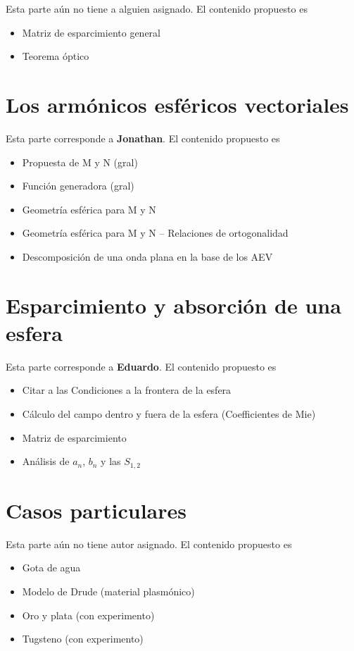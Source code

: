 \documentclass[12pts,a4paper]{book}
\begin{document}
Esta parte aún no tiene a alguien asignado. El contenido propuesto es

\begin{itemize}
 \item Matriz de esparcimiento general
 \item Teorema óptico
\end{itemize}



\chapter{Los armónicos esféricos vectoriales}
\label{ch:AEV} %
Esta parte corresponde a \textbf{Jonathan}. El contenido propuesto es

\begin{itemize}
 \item Propuesta de M y N (gral)
 \item Función generadora (gral)
 \item Geometría esférica para M y N
 \item Geometría esférica para M y N -- Relaciones de ortogonalidad
  \item Descomposición de una onda plana en la base de los AEV
\end{itemize}

\chapter{Esparcimiento y absorción de una esfera}
\label{ch:AEV} %
Esta parte corresponde a \textbf{Eduardo}. El contenido propuesto es

\begin{itemize}
 \item Citar a las Condiciones a la frontera de la esfera
 \item Cálculo del campo dentro y fuera de la esfera (Coefficientes de Mie)
 \item Matriz de esparcimiento
 \item Análisis de $a_n$, $b_n$ y las $S_{1,2}$
\end{itemize}

\chapter{Casos particulares}
\label{ch:CasosPart} %
Esta parte aún no tiene autor asignado. El contenido propuesto es

\begin{itemize}
 \item Gota de agua
 \item Modelo de Drude (material plasmónico)
 \item Oro y plata (con experimento)
 \item Tugsteno (con experimento)
\end{itemize}





\printindex
\end{document}
